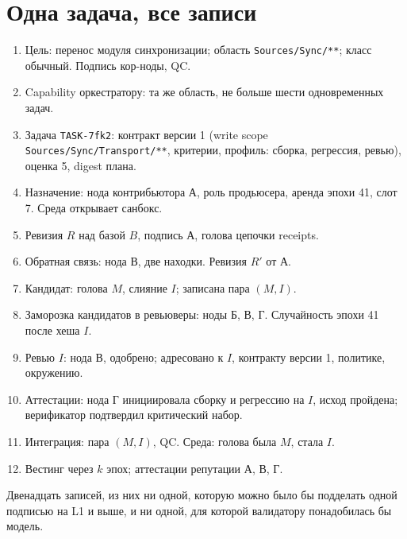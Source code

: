 \section{Одна задача, все записи}

\begin{exbox}
\begin{enumerate}
\item Цель: перенос модуля синхронизации; область \texttt{Sources/Sync/**}; класс обычный. Подпись кор-ноды, QC.
\item Capability оркестратору: та же область, не больше шести одновременных задач.
\item Задача \texttt{TASK-7fk2}: контракт версии 1 (write scope \texttt{Sources/Sync/Transport/**}, критерии, профиль: сборка, регрессия, ревью), оценка 5, digest плана.
\item Назначение: нода контрибьютора А, роль продьюсера, аренда эпохи 41, слот 7. Среда открывает санбокс.
\item Ревизия $R$ над базой $B$, подпись А, голова цепочки receipts.
\item Обратная связь: нода В, две находки. Ревизия $R'$ от А.
\item Кандидат: голова $M$, слияние $I$; записана пара $(M, I)$.
\item Заморозка кандидатов в ревьюверы: ноды Б, В, Г. Случайность эпохи 41 после хеша $I$.
\item Ревью $I$: нода В, одобрено; адресовано к $I$, контракту версии 1, политике, окружению.
\item Аттестации: нода Г инициировала сборку и регрессию на $I$, исход пройдена; верификатор подтвердил критический набор.
\item Интеграция: пара $(M, I)$, QC. Среда: голова была $M$, стала $I$.
\item Вестинг через $k$ эпох; аттестации репутации А, В, Г.
\end{enumerate}
Двенадцать записей, из них ни одной, которую можно было бы подделать одной подписью на L1 и выше, и ни одной, для которой валидатору понадобилась бы модель.
\end{exbox}
